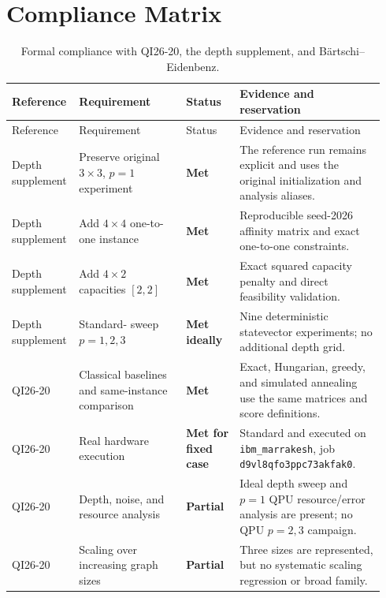 \section{Compliance Matrix}
\label{app:compliance}

\begin{landscape}
\small
\setlength{\tabcolsep}{4pt}
\begin{longtable}{p{0.14\linewidth}p{0.28\linewidth}p{0.14\linewidth}p{0.38\linewidth}}
\caption{Formal compliance with QI26-20, the depth supplement, and Bärtschi--Eidenbenz.}\\
\toprule
Reference & Requirement & Status & Evidence and reservation\\
\midrule
\endfirsthead
\toprule
Reference & Requirement & Status & Evidence and reservation\\
\midrule
\endhead
Depth supplement & Preserve original $3\times3$, $p=1$ experiment & \cellcolor{AuditMet}\textbf{Met} & The reference run remains explicit and uses the original initialization and analysis aliases.\\
Depth supplement & Add $4\times4$ one-to-one instance & \cellcolor{AuditMet}\textbf{Met} & Reproducible seed-2026 affinity matrix and exact one-to-one constraints.\\
Depth supplement & Add $4\times2$ capacities $[2,2]$ & \cellcolor{AuditMet}\textbf{Met} & Exact squared capacity penalty and direct feasibility validation.\\
Depth supplement & Standard-\QAOA{} sweep $p=1,2,3$ & \cellcolor{AuditMet}\textbf{Met ideally} & Nine deterministic statevector experiments; no additional depth grid.\\
QI26-20 & Classical baselines and same-instance comparison & \cellcolor{AuditMet}\textbf{Met} & Exact, Hungarian, greedy, and simulated annealing use the same matrices and score definitions.\\
QI26-20 & Real hardware execution & \cellcolor{AuditMet}\textbf{Met for fixed case} & Standard \QAOA{} and \GMQAOA{} executed on \texttt{ibm\_marrakesh}, job \texttt{d9vl8qfo3ppc73akfak0}.\\
QI26-20 & Depth, noise, and resource analysis & \cellcolor{AuditPartial}\textbf{Partial} & Ideal depth sweep and $p=1$ QPU resource/error analysis are present; no QPU $p=2,3$ campaign.\\
QI26-20 & Scaling over increasing graph sizes & \cellcolor{AuditPartial}\textbf{Partial} & Three sizes are represented, but no systematic scaling regression or broad family.\\

\end{longtable}
\end{landscape}

